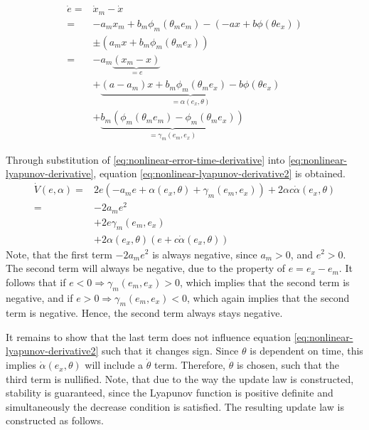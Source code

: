 \begin{equation}
    \begin{aligned}
    \dot e 
= & \dot x_m - \dot x \\ 
= & -a_mx_m + b_m\phi_m(\theta_me_m) - (-ax + b\phi(\theta e_x)) \\
    & \pm (a_mx + b_m \phi_m(\theta_m e_x)) \\
    = & -a_m \underbrace{(x_m-x)}_{=e} \\ 
    & + \underbrace{(a-a_m)x+b_m\phi_m(\theta_me_x) - b\phi(\theta e_x)}_{=\alpha(e_x, \theta)} \\ 
    & + \underbrace{b_m(\phi_m(\theta_m e_m)-\phi_m(\theta_m e_x))}_{=\gamma_m(e_m,e_x)}
    \end{aligned}
    \label{eq:nonlinear-error-time-derivative}
\end{equation}

Through substitution of \eqref{eq:nonlinear-error-time-derivative} into \eqref{eq:nonlinear-lyapunov-derivative}, equation \eqref{eq:nonlinear-lyapunov-derivative2} is obtained.
\begin{equation}
    \begin{aligned}
    \dot V(e, \alpha) 
    = & 2e(-a_me + \alpha(e_x, \theta) + \gamma_m(e_m, e_x)) + 2\alpha c \dot \alpha(e_x, \theta)\\
    = & -2a_me^2 \\ 
    & + 2e\gamma_m(e_m, e_x) 
    \\ 
    & + 2\alpha(e_x, \theta)(e + c \dot \alpha(e_x, \theta))
    \end{aligned}
    \label{eq:nonlinear-lyapunov-derivative2}
\end{equation}
Note, that the first term $-2a_me^2$ is always negative, since $a_m>0$, and $e^2 > 0$. The second term will always be negative, due to the property of $e=e_x-e_m$. It follows that if $e<0 \Rightarrow \gamma_m(e_m, e_x)>0$, which implies that the second term is negative, and if $e>0 \Rightarrow \gamma_m(e_m, e_x)<0$, which again implies that the second term is negative. Hence, the second term always stays negative.

It remains to show that the last term does not influence equation \eqref{eq:nonlinear-lyapunov-derivative2} such that it changes sign. Since $\theta$ is dependent on time, this implies $\dot \alpha(e_x, \theta)$ will include a $\dot \theta$ term. Therefore, $\dot \theta$ is chosen, such that the third term is nullified. Note, that due to the way the update law is constructed, stability is guaranteed, since the Lyapunov function is positive definite and simultaneously the decrease condition is satisfied. The resulting update law is constructed as follows.


